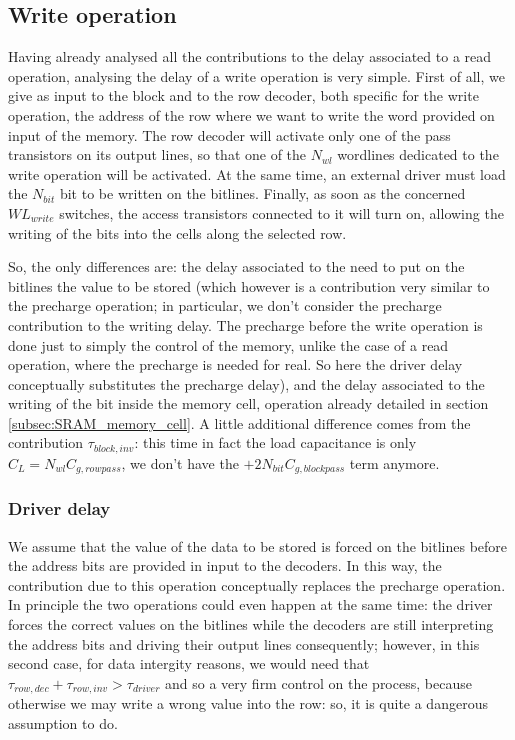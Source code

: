 \subsection{Write operation}
Having already analysed all the contributions to the delay associated to a read operation, analysing the delay of a write operation is very simple. First of all, we give as input to the block and to the row decoder, both specific for the write operation, the address of the row where we want to write the word provided on input of the memory. The row decoder will activate only one of the pass transistors on its output lines, so that one of the $N_{wl}$ wordlines dedicated to the write operation will be activated. At the same time, an external driver must load the $N_{bit}$ bit to be written on the bitlines. Finally, as soon as the concerned $WL_{write}$ switches, the access transistors connected to it will turn on, allowing the writing of the bits into the cells along the selected row. 

So, the only differences are: the delay associated to the need to put on the bitlines the value to be stored (which however is a contribution very similar to the precharge operation; in particular, we don't consider the precharge contribution to the writing delay. The precharge before the write operation is done just to simply the control of the memory, unlike the case of a read operation, where the precharge is needed for real. So here the driver delay conceptually substitutes the precharge delay), and the delay associated to the writing of the bit inside the memory cell, operation already detailed in section \ref{subsec:SRAM_memory_cell}. A little additional difference comes from the contribution $\tau_{block,inv}$: this time in fact the load capacitance is only $C_L=N_{wl}C_{g,rowpass}$, we don't have the $+2N_{bit}C_{g,blockpass}$ term anymore. 

\subsubsection{Driver delay}
\label{sec:driver_delay}
We assume that the value of the data to be stored is forced on the bitlines before the address bits are provided in input to the decoders. In this way, the contribution due to this operation conceptually replaces the precharge operation. In principle the two operations could even happen at the same time: the driver forces the correct values on the bitlines while the decoders are still interpreting the address bits and driving their output lines consequently; however, in this second case, for data intergity reasons, we would need that $\tau_{row,dec}+\tau_{row,inv}>\tau_{driver}$ and so a very firm control on the process, because otherwise we may write a wrong value into the row: so, it is quite a dangerous assumption to do. 

